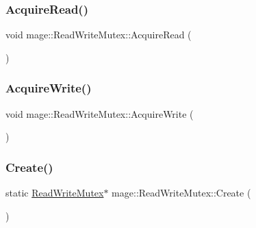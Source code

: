 \subsubsection{\texorpdfstring{Acquire\+Read()}{AcquireRead()}}
{\footnotesize\ttfamily void mage\+::\+Read\+Write\+Mutex\+::\+Acquire\+Read (\begin{DoxyParamCaption}{ }\end{DoxyParamCaption})\hspace{0.3cm}{\ttfamily [private]}}

\hypertarget{classmage_1_1_read_write_mutex_a76137013107a9c2c1fc05c1e0747965e}{}\label{classmage_1_1_read_write_mutex_a76137013107a9c2c1fc05c1e0747965e} 
\subsubsection{\texorpdfstring{Acquire\+Write()}{AcquireWrite()}}
{\footnotesize\ttfamily void mage\+::\+Read\+Write\+Mutex\+::\+Acquire\+Write (\begin{DoxyParamCaption}{ }\end{DoxyParamCaption})\hspace{0.3cm}{\ttfamily [private]}}

\hypertarget{classmage_1_1_read_write_mutex_ad184ba46c44446b5ebe1026801fcac9b}{}\label{classmage_1_1_read_write_mutex_ad184ba46c44446b5ebe1026801fcac9b} 
\subsubsection{\texorpdfstring{Create()}{Create()}}
{\footnotesize\ttfamily static \hyperlink{classmage_1_1_read_write_mutex}{Read\+Write\+Mutex}$\ast$ mage\+::\+Read\+Write\+Mutex\+::\+Create (\begin{DoxyParamCaption}{ }\end{DoxyParamCaption})\hspace{0.3cm}{\ttfamily [static]}}

\hypertarget{classmage_1_1_read_write_mutex_a879992fe8bf7fc81df9fa5ffa1c380a3}{}\label{classmage_1_1_read_write_mutex_a879992fe8bf7fc81df9fa5ffa1c380a3} 
